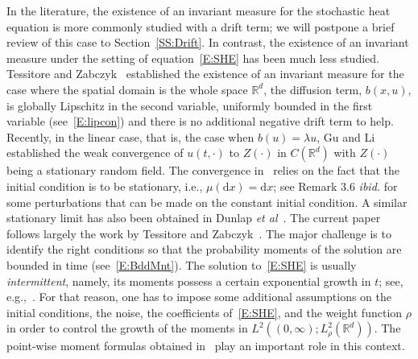 \documentclass[sn-mathphys]{sn-jnl}%
\newcommand{\BR}{\mathbb{R}}
\newcommand{\ud}{\ensuremath{\mathrm{d}}}
\numberwithin{equation}{section}
\theoremstyle{thmstyleone}%
\theoremstyle{thmstyletwo}%
\theoremstyle{thmstylethree}%
\begin{document}
In the literature, the existence of an invariant measure for the stochastic heat equation is more
commonly studied with a drift term; we will postpone a brief review of this case to
Section~\ref{SS:Drift}. In contrast, the existence of an invariant measure under the setting of
equation~\eqref{E:SHE} has been much less studied. Tessitore and
Zabczyk~\cite{tessitore.zabczyk:98:invariant} established the existence of an invariant measure for
the case where the spatial domain is the whole space $\BR^d$, the diffusion term, $b(x,u)$, is
globally Lipschitz in the second variable, uniformly bounded in the first variable
(see~\eqref{E:lipcon}) and there is no additional negative drift term to help. Recently, in the
linear case, that is, the case when $b(u) = \lambda u$, Gu and Li~\cite{gu.li:20:fluctuations}
established the weak convergence of $u(t,\cdot)$ to $Z(\cdot)$ in $C(\BR^d)$ with $Z(\cdot)$ being a
stationary random field. The convergence in~\cite{gu.li:20:fluctuations} relies on the fact that the
initial condition is to be stationary, i.e., $\mu(\ud x) = \ud x$; see Remark 3.6 {\it ibid.} for
some perturbations that can be made on the constant initial condition. A similar stationary limit has
also been obtained in Dunlap {\it et al}~\cite{dunlap.gu.ea:21:random}. The current paper follows
largely the work by Tessitore and Zabczyk~\cite{tessitore.zabczyk:98:invariant}. The major challenge
is to identify the right conditions so that the probability moments of the solution are bounded in
time (see~\eqref{E:BddMnt}). The solution to~\eqref{E:SHE} is usually \textit{intermittent}, namely,
its moments possess a certain exponential growth in $t$; see,
e.g.,~\cite{carmona.molchanov:94:parabolic,foondun.khoshnevisan:09:intermittence}. For that reason,
one has to impose some additional assumptions on the initial conditions, the noise, the coefficients
of~\eqref{E:SHE}, and the weight function $\rho$ in order to control the growth of the moments in
$L^2\left((0,\infty); L_\rho^2(\BR^d)\right)$. The point-wise moment formulas obtained
in~\cite{chen.huang:19:comparison,chen.kim:19:nonlinear} play an important role in this context.
\end{document}
